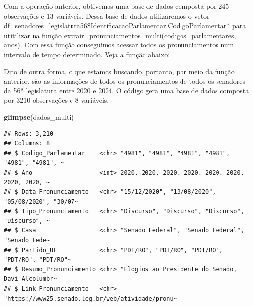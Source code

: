 \documentclass{article}
\newenvironment{Shaded}{\begin{snugshade}}{\end{snugshade}}
\newcommand{\AttributeTok}[1]{\textcolor[rgb]{0.13,0.29,0.53}{#1}}
\newcommand{\DecValTok}[1]{\textcolor[rgb]{0.00,0.00,0.81}{#1}}
\newcommand{\FunctionTok}[1]{\textcolor[rgb]{0.13,0.29,0.53}{\textbf{#1}}}
\newcommand{\NormalTok}[1]{#1}
\newcommand{\OtherTok}[1]{\textcolor[rgb]{0.56,0.35,0.01}{#1}}
\newcommand{\SpecialCharTok}[1]{\textcolor[rgb]{0.81,0.36,0.00}{\textbf{#1}}}
\begin{document}
Com a operação anterior, obtivemos uma base de dados composta por 245
observações e 13 variáveis. Dessa base de dados utilizaremos o vetor
df\_senadores\_legislatura56\$IdentificacaoParlamentar.CodigoParlamentar*
para utitilizar na função
extrair\_pronunciamentos\_multi(codigos\_parlamentares, anos). Com essa
função conseguimos acessar todos os pronunciamentos num intervalo de
tempo determinado. Veja a função abaixo:

\begin{Shaded}
\end{Shaded}

Dito de outra forma, o que estamos buscando, portanto, por meio da
função anterior, são as informações de todos os pronunciamentos de todos
os senadores da 56ª legislatura entre 2020 e 2024. O código gera uma
base de dados composta por 3210 observações e 8 variáveis.

\begin{Shaded}
\begin{Highlighting}[]
\FunctionTok{glimpse}\NormalTok{(dados\_multi)}
\end{Highlighting}
\end{Shaded}

\begin{verbatim}
## Rows: 3,210
## Columns: 8
## $ Codigo_Parlamentar    <chr> "4981", "4981", "4981", "4981", "4981", "4981", ~
## $ Ano                   <int> 2020, 2020, 2020, 2020, 2020, 2020, 2020, 2020, ~
## $ Data_Pronunciamento   <chr> "15/12/2020", "13/08/2020", "05/08/2020", "30/07~
## $ Tipo_Pronunciamento   <chr> "Discurso", "Discurso", "Discurso", "Discurso", ~
## $ Casa                  <chr> "Senado Federal", "Senado Federal", "Senado Fede~
## $ Partido_UF            <chr> "PDT/RO", "PDT/RO", "PDT/RO", "PDT/RO", "PDT/RO"~
## $ Resumo_Pronunciamento <chr> "Elogios ao Presidente do Senado, Davi Alcolumbr~
## $ Link_Pronunciamento   <chr> "https://www25.senado.leg.br/web/atividade/pronu~
\end{verbatim}
\end{document}
